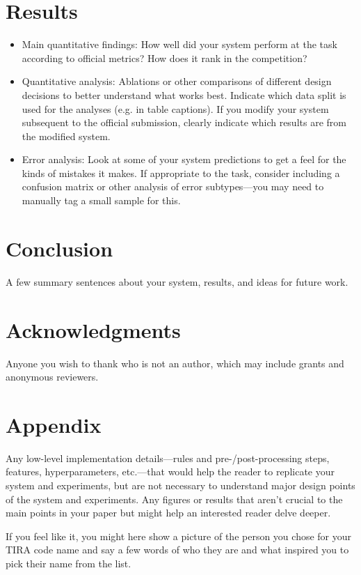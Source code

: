 \documentclass[11pt]{article}
\begin{document}
\section{Results}

\begin{itemize}
	\item Main quantitative findings: How well did your system perform at the task according to official metrics? How does it rank in the competition?
	
	\item Quantitative analysis: Ablations or other comparisons of different design decisions to better understand what works best. Indicate which data split is used for the analyses (e.g. in table captions). If you modify your system subsequent to the official submission, clearly indicate which results are from the modified system.
	
	\item Error analysis: Look at some of your system predictions to get a feel for the kinds of mistakes it makes. If appropriate to the task, consider including a confusion matrix or other analysis of error subtypes—you may need to manually tag a small sample for this.
	
\end{itemize}

\section{Conclusion}
A few summary sentences about your system, results, and ideas for future work.

\section{Acknowledgments}
Anyone you wish to thank who is not an author, which may include grants and anonymous reviewers.





\appendix
\section{Appendix}
Any low-level implementation details—rules and pre-/post-processing steps, features, hyperparameters, etc.—that would help the reader to replicate your system and experiments, but are not necessary to understand major design points of the system and experiments. Any figures or results that aren’t crucial to the main points in your paper but might help an interested reader delve deeper.

If you feel like it, you might here show a picture of the person you chose for your TIRA code name and say a few words of who they are and what inspired you to pick their name from the list.
\end{document}
